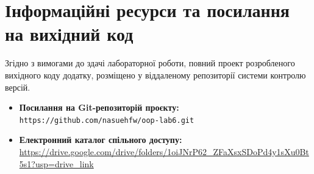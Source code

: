 \section{Інформаційні ресурси та посилання на вихідний код}

Згідно з вимогами до здачі лабораторної роботи, повний проект розробленого вихідного коду   
додатку, розміщено у віддаленому репозиторії системи контролю версій. 

\begin{itemize}
    \item \textbf{Посилання на Git-репозиторій проєкту:} \\
    \texttt{https://github.com/nasuehfw/oop-lab6.git} %
    \item \textbf{Електронний каталог спільного доступу:} \\
    \url{https://drive.google.com/drive/folders/1oiJNrP62_ZFaXsxSDoPd4y1sXu0Bt5s1?usp=drive_link} 
\end{itemize}

